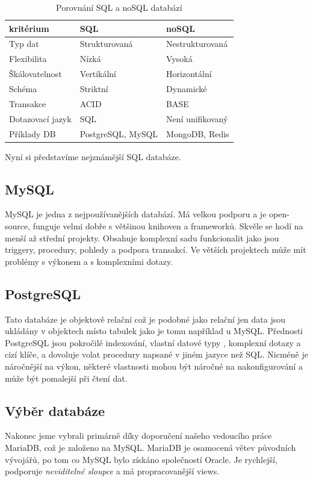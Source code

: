 \begin{table}
    \centering
    \begin{tabular}{|l|l|l|}
        \hline
        kritérium        & SQL               & noSQL            \\
        \hline
        Typ dat          & Strukturovaná     & Nestrukturovaná  \\
        Flexibilita      & Nízká             & Vysoká           \\
        Škálovatelnost   & Vertikální        & Horizontální     \\
        Schéma           & Striktní          & Dynamické        \\
        Transakce        & ACID              & BASE             \\
        Dotazovací jazyk & SQL               & Není unifikovaný \\
        Příklady DB      & PostgreSQL, MySQL & MongoDB, Redis   \\
    \end{tabular}
    \caption{Porovnání SQL a noSQL databází}\label{tab:sql_vs_nosql}
\end{table}

Nyní si představíme nejznámější SQL databáze.

\subsection{MySQL}\label{sec:data_storage:mysql}
MySQL je jedna z nejpoužívanějších databází. Má velkou podporu a je open-source, funguje velmi dobře s většinou knihoven a frameworků. Skvěle se hodí na menší až střední projekty. Obsahuje komplexní sadu funkcionalit jako jsou triggery, procedury, pohledy a podpora transakcí. Ve větších projektech může mít problémy s výkonem  a s komplexními dotazy.


\subsection{PostgreSQL}\label{sec:data_storage:postgresql}
Tato databáze je objektově relační což je podobné jako relační jen data jsou ukládány v objektech místo tabulek jako je tomu například u MySQL. Přednosti PostgreSQL jsou pokročilé indexování, vlastní datové typy , komplexní dotazy a cizí klíče, a dovoluje volat procedury napsané v jiném jazyce než SQL. Nicméně je náročnější na výkon, některé vlastnosti mohou být náročné na nakonfigurování a může být pomalejší při čtení dat.

\subsection{Výběr databáze}
Nakonec jsme vybrali primárně díky doporučení našeho vedoucího práce MariaDB, což je založeno na MySQL. MariaDB je osamocená větev původních vývojářů, po tom co MySQL bylo získáno společností Oracle. Je rychlejší, podporuje \textit{neviditelné sloupce} a má propracovanější views.



\cite{guidetochoosingdatabase}\cite{howtochoosedatabase} %


\